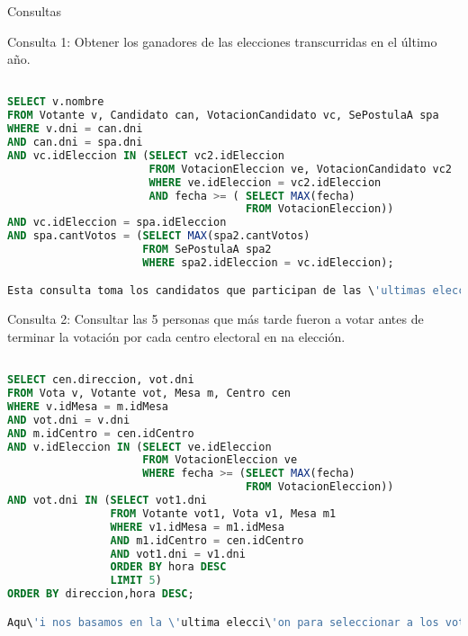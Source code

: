 \begin{section}{Consultas}


\noindent Consulta 1: Obtener los ganadores de las elecciones transcurridas en el \'ultimo año.

\begin{lstlisting}[language=SQL, basicstyle=\footnotesize]

SELECT v.nombre
FROM Votante v, Candidato can, VotacionCandidato vc, SePostulaA spa
WHERE v.dni = can.dni
AND can.dni = spa.dni
AND vc.idEleccion IN (SELECT vc2.idEleccion
                      FROM VotacionEleccion ve, VotacionCandidato vc2
                      WHERE ve.idEleccion = vc2.idEleccion
                      AND fecha >= ( SELECT MAX(fecha)
                                     FROM VotacionEleccion))
AND vc.idEleccion = spa.idEleccion
AND spa.cantVotos = (SELECT MAX(spa2.cantVotos)
                     FROM SePostulaA spa2
                     WHERE spa2.idEleccion = vc.idEleccion);

Esta consulta toma los candidatos que participan de las \'ultimas elecciones a partir de la VotacionCandidato y luego los filtra de acuerdo con la cantidad de votos, para as\'i obtener a los ganadores.

\end{lstlisting} 

\noindent Consulta 2: Consultar las 5 personas que m\'as tarde fueron a votar antes de terminar la votaci\'on por cada centro electoral en na elecci\'on.

\begin{lstlisting}[language=SQL, basicstyle=\footnotesize]

SELECT cen.direccion, vot.dni
FROM Vota v, Votante vot, Mesa m, Centro cen
WHERE v.idMesa = m.idMesa
AND vot.dni = v.dni
AND m.idCentro = cen.idCentro
AND v.idEleccion IN (SELECT ve.idEleccion
                     FROM VotacionEleccion ve
                     WHERE fecha >= (SELECT MAX(fecha)
                                     FROM VotacionEleccion))
AND vot.dni IN (SELECT vot1.dni
                FROM Votante vot1, Vota v1, Mesa m1
                WHERE v1.idMesa = m1.idMesa
                AND m1.idCentro = cen.idCentro
                AND vot1.dni = v1.dni
                ORDER BY hora DESC
                LIMIT 5)
ORDER BY direccion,hora DESC;

Aqu\'i nos basamos en la \'ultima elecci\'on para seleccionar a los votantes que participaronde ella y luego tomamos \'unicamente aquellos que en horario llegaron m\'as tarde. El ORDER BY hora DESC sumado al LIMIT 5 del SELECT anidado nos permite restringir los DNIs de los votantes por horario m\'as tard\'io. Luego, agrupamos las tuplas de salida por centro para clarificar el resultado.


\end{lstlisting}
\end{section}
